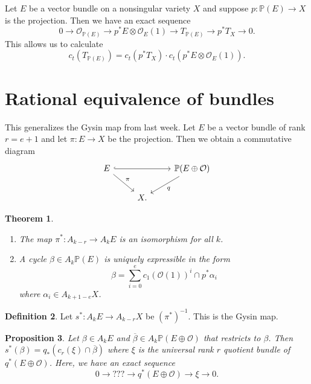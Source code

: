 \documentclass[leqno, openany]{memoir}
\newtheorem{thm}{Theorem}[section]
\newtheorem{prop}[thm]{Proposition}
\theoremstyle{definition}
\newtheorem{defn}[thm]{Definition}
\theoremstyle{remark}
\theoremstyle{plain}
\theoremstyle{definition}
\theoremstyle{remark}
\renewcommand{\P}{\mathbb{P}}
\newcommand{\mc}[1]{\mathcal{#1}}
\newcommand{\ol}[1]{\overline{#1}}
\begin{document}
Let $E$ be a vector bundle on a nonsingular variety $X$ and suppose $p \colon \P(E) \to X$ is the projection. Then we have an exact sequence
\[ 0 \to \mc{O}_{\P(E)} \to p^* E \otimes \mc{O}_E(1) \to T_{\P(E)} \to p^* T_X \to 0. \]
This allows us to calculate
\[ c_t(T_{\P(E)}) = c_t(p^* T_X) \cdot c_t(p^*E \otimes \mc{O}_E(1)). \]

\section{Rational equivalence of bundles}%
\label{sec:rational_equivalence_of_bundles}

This generalizes the Gysin map from last week. Let $E$ be a vector bundle of rank $r = e+1$ and let $\pi \colon E \to X$ be the projection. Then we obtain a commutative diagram
\begin{equation*}
\begin{tikzcd}
    E \ar[hookrightarrow]{rr} \ar{dr}{\pi} & & \P(E \oplus \mc{O}) \ar{dl}{q} \\
                                           & X.
\end{tikzcd}
\end{equation*}

\begin{thm}\leavevmode
    \begin{enumerate}
        \item The map $\pi^* \colon A_{k-r} \to A_k E$ is an isomorphism for all $k$.
        \item A cycle $\beta \in A_k \P(E)$ is uniquely expressible in the form
            \[ \beta = \sum_{i=0}^e {c_1(\mc{O}(1))}^i \cap p^* \alpha_i \]
            where $\alpha_i \in A_{k+1-e} X$.
    \end{enumerate}
\end{thm}

\begin{defn}
    Let $s^* \colon A_k E \to A_{k-r} X$ be ${(\pi^*)}^{-1}$. This is the Gysin map. 
\end{defn}

\begin{prop}
    Let $\beta \in A_k E$ and $\ol{\beta} \in A_k \P(E \oplus \mc{O})$ that restricts to $\beta$. Then $s^*(\beta) = q_* (c_r(\xi) \cap \ol{\beta})$ where $\xi$ is the universal rank $r$ quotient bundle of $q^* (E \oplus \mc{O})$. Here, we have an exact sequence
    \[ 0 \to {???} \to q^*(E \oplus \mc{O}) \to \xi \to 0. \]
\end{prop}
\end{document}
